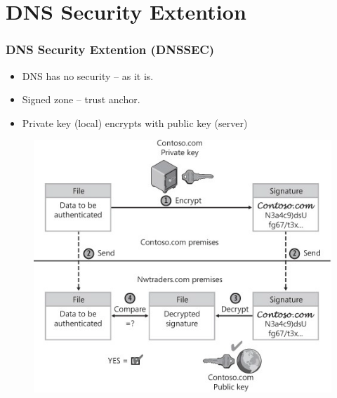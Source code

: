 \documentclass{beamer}
\begin{document}
\section{DNS Security Extention}
	\begin{frame}
		\frametitle{DNS Security Extention (DNSSEC)}
		
		
			\begin{itemize}
			\item DNS has no security -- as it is.
			\item Signed zone -- trust anchor.
			\item Private key (local) encrypts with public key (server)
			\end{itemize}
			
			\begin{figure}[hbtp]
			\centering
			\includegraphics[scale=0.5]{keys}
			\end{figure}
		
		
	\end{frame}
	
\end{document}
